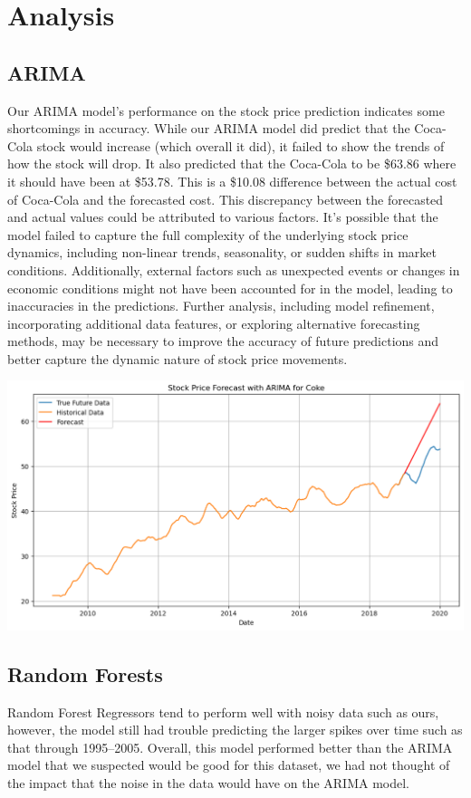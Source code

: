 \documentclass[11pt]{article}
\begin{document}
\section{Analysis}

\subsection{ARIMA}
Our ARIMA model's performance on the stock price prediction indicates some shortcomings in accuracy. While our ARIMA 
model did predict that the Coca-Cola stock would increase (which overall it did), it failed to show the trends of how 
the stock will drop. It also predicted that the Coca-Cola to be \$63.86 where it should have been at \$53.78. This is 
a \$10.08 difference between the actual cost of Coca-Cola and the forecasted cost. This discrepancy between the 
forecasted and actual values could be attributed to various factors. It's possible that the model failed to capture 
the full complexity of the underlying stock price dynamics, including non-linear trends, seasonality, or sudden shifts 
in market conditions. Additionally, external factors such as unexpected events or changes in economic conditions might 
not have been accounted for in the model, leading to inaccuracies in the predictions. Further analysis, including model 
refinement, incorporating additional data features, or exploring alternative forecasting methods, may be necessary to 
improve the accuracy of future predictions and better capture the dynamic nature of stock price movements.


\includegraphics[width=\textwidth]{../images/ARIMA-Coke.pdf}


\subsection{Random Forests}
Random Forest Regressors tend to perform well with noisy data such as ours, however, the model still had 
trouble predicting the larger spikes over time such as that through 1995--2005. Overall, this model performed 
better than the ARIMA model that we suspected would be good for this dataset, we had not thought of the 
impact that the noise in the data would have on the ARIMA model.
\end{document}
